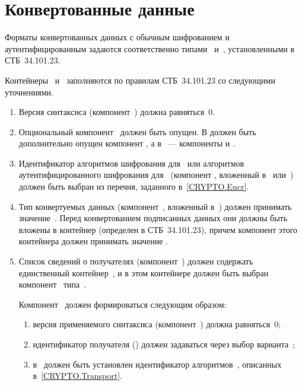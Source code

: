 \section{Конвертованные данные}\label{FMT.EnvelopedData}

Форматы конвертованных данных с обычным шифрованием и аутентифицированным
задаются соответственно типами~ и~, 
установленными в СТБ~34.101.23.

Контейнеры~ и~ заполняются по 
правилам СТБ~34.101.23 со следующими уточнениями.

\begin{enumerate}
\item
Версия синтаксиса (компонент~) должна равняться~$0$. 

\item
Опциональный компонент~ должен быть опущен.
В  должен быть дополнительно опущен компонент 
, а в ~--- компоненты
 и .

\item
Идентификатор алгоритмов шифрования для~ или 
алгоритмов аутентифицированного шифрования для~
(компонент , вложенный 
в~ или~)
должен быть выбран из перечня, заданного в~\ref{CRYPTO.Encr}.

\item
Тип конвертуемых данных (компонент~, вложенный 
в~) должен принимать значение~. 
Перед конвертованием подписанных данных они должны быть вложены в контейнер 
 (определен в СТБ~34.101.23), причем компонент 
 этого контейнера должен принимать значение 
.

\item
Список сведений о получателях (компонент~)
должен содержать единственный контейнер~, 
и в этом контейнере должен быть выбран компонент~ 
типа~. 

Компонент~ должен формироваться следующим образом:
\begin{enumerate}
\item
версия применяемого синтаксиса (компонент~)
должна равняться~$0$;
\item
идентификатор получателя () должен задаваться через выбор 
варианта~;
\item
в~ должен быть установлен идентификатор
алгоритмов~, описанных в~\ref{CRYPTO.Transport}.
\end{enumerate}

\end{enumerate}
